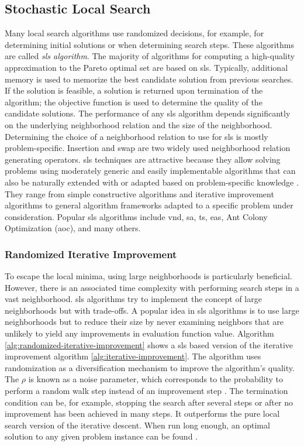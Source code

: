 \subsection{Stochastic Local Search}
Many local search algorithms use randomized decisions, for example, for determining initial solutions or when determining search steps. These algorithms are called \textit{\gls{sls} algorithm}. The majority of algorithms for computing a high-quality approximation to the Pareto optimal set are based on \gls{sls}. Typically, additional memory is used to memorize the best candidate solution from previous searches. If the solution is feasible, a solution is returned upon termination of the algorithm; the objective function is used to determine the quality of the candidate solutions. 
The performance of any \gls{sls} algorithm depends significantly on the underlying neighborhood relation and the size of the neighborhood. Determining the choice of a neighborhood relation to use for \gls{sls} is mostly problem-specific. Insertion and swap are two widely used neighborhood relation generating operators. 
\Gls{sls} techniques are attractive because they allow solving problems using moderately generic and easily implementable algorithms that can also be naturally extended with or adapted based on problem-specific knowledge \parencite{HolgerH2013StochasticApplications}. They range from simple constructive algorithms and iterative improvement algorithms to general algorithm frameworks adapted to a specific problem under consideration. Popular \gls{sls} algorithms include \gls{vnd}, \gls{sa}, \gls{ts}, \glspl{ea}, Ant Colony Optimization (\gls{aoc}), and many others. 

\subsubsection{Randomized Iterative Improvement}
To escape the local minima, using large neighborhoods is particularly beneficial. However, there is an associated time complexity with performing search steps in a vast neighborhood. \Gls{sls} algorithms try to implement the concept of large neighborhoods but with trade-offs. A popular idea in \gls{sls} algorithms is to use large neighborhoods but to reduce their size by never examining neighbors that are unlikely to yield any improvements in evaluation function value. 
Algorithm \ref{alg:randomized-iterative-improvement} shows a \gls{sls} based version of the iterative improvement algorithm \ref{alg:iterative-improvement}. The algorithm uses randomization as a diversification mechanism to improve the algorithm's quality. The $\rho$ is known as a noise parameter, which corresponds to the probability to perform a random walk step instead of an improvement step \parencite{HolgerH2013StochasticApplications}. The termination condition can be, for example, stopping the search after several steps or after no improvement has been achieved in many steps. It outperforms the pure local search version of the iterative descent. When run long enough, an optimal solution to any given problem instance can be found \parencite{HolgerH2013StochasticApplications}.

